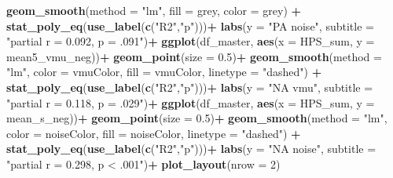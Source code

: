 \documentclass[
]{article}
\newenvironment{Shaded}{\begin{snugshade}}{\end{snugshade}}
\newcommand{\AttributeTok}[1]{\textcolor[rgb]{0.13,0.29,0.53}{#1}}
\newcommand{\DecValTok}[1]{\textcolor[rgb]{0.00,0.00,0.81}{#1}}
\newcommand{\FloatTok}[1]{\textcolor[rgb]{0.00,0.00,0.81}{#1}}
\newcommand{\FunctionTok}[1]{\textcolor[rgb]{0.13,0.29,0.53}{\textbf{#1}}}
\newcommand{\NormalTok}[1]{#1}
\newcommand{\SpecialCharTok}[1]{\textcolor[rgb]{0.81,0.36,0.00}{\textbf{#1}}}
\newcommand{\StringTok}[1]{\textcolor[rgb]{0.31,0.60,0.02}{#1}}
\begin{document}
\begin{Shaded}
\begin{Highlighting}[]
  \FunctionTok{geom\_smooth}\NormalTok{(}\AttributeTok{method =} \StringTok{"lm"}\NormalTok{, }\AttributeTok{fill =} \StringTok{\textquotesingle{}grey\textquotesingle{}}\NormalTok{, }\AttributeTok{color =} \StringTok{\textquotesingle{}grey\textquotesingle{}}\NormalTok{) }\SpecialCharTok{+}
  \FunctionTok{stat\_poly\_eq}\NormalTok{(}\FunctionTok{use\_label}\NormalTok{(}\FunctionTok{c}\NormalTok{(}\StringTok{"R2"}\NormalTok{,}\StringTok{"p"}\NormalTok{)))}\SpecialCharTok{+}
  \FunctionTok{labs}\NormalTok{(}\AttributeTok{y =} \StringTok{"PA noise"}\NormalTok{,}
       \AttributeTok{subtitle =} \StringTok{"partial r = 0.092, p = .091"}\NormalTok{)}\SpecialCharTok{+}
\FunctionTok{ggplot}\NormalTok{(df\_master, }\FunctionTok{aes}\NormalTok{(}\AttributeTok{x =}\NormalTok{ HPS\_sum, }\AttributeTok{y =}\NormalTok{ mean5\_vmu\_neg))}\SpecialCharTok{+}
  \FunctionTok{geom\_point}\NormalTok{(}\AttributeTok{size =} \FloatTok{0.5}\NormalTok{)}\SpecialCharTok{+}
  \FunctionTok{geom\_smooth}\NormalTok{(}\AttributeTok{method =} \StringTok{"lm"}\NormalTok{, }\AttributeTok{color =}\NormalTok{ vmuColor, }\AttributeTok{fill =}\NormalTok{ vmuColor, }\AttributeTok{linetype =} \StringTok{"dashed"}\NormalTok{) }\SpecialCharTok{+}
  \FunctionTok{stat\_poly\_eq}\NormalTok{(}\FunctionTok{use\_label}\NormalTok{(}\FunctionTok{c}\NormalTok{(}\StringTok{"R2"}\NormalTok{,}\StringTok{"p"}\NormalTok{)))}\SpecialCharTok{+}
  \FunctionTok{labs}\NormalTok{(}\AttributeTok{y =} \StringTok{"NA vmu"}\NormalTok{,}
       \AttributeTok{subtitle =} \StringTok{"partial r = 0.118, p = .029"}\NormalTok{)}\SpecialCharTok{+}
\FunctionTok{ggplot}\NormalTok{(df\_master, }\FunctionTok{aes}\NormalTok{(}\AttributeTok{x =}\NormalTok{ HPS\_sum, }\AttributeTok{y =}\NormalTok{ mean\_s\_neg))}\SpecialCharTok{+}
  \FunctionTok{geom\_point}\NormalTok{(}\AttributeTok{size =} \FloatTok{0.5}\NormalTok{)}\SpecialCharTok{+}
  \FunctionTok{geom\_smooth}\NormalTok{(}\AttributeTok{method =} \StringTok{"lm"}\NormalTok{, }\AttributeTok{color =}\NormalTok{ noiseColor, }\AttributeTok{fill =}\NormalTok{ noiseColor, }\AttributeTok{linetype =} \StringTok{"dashed"}\NormalTok{) }\SpecialCharTok{+}
  \FunctionTok{stat\_poly\_eq}\NormalTok{(}\FunctionTok{use\_label}\NormalTok{(}\FunctionTok{c}\NormalTok{(}\StringTok{"R2"}\NormalTok{,}\StringTok{"p"}\NormalTok{)))}\SpecialCharTok{+}
  \FunctionTok{labs}\NormalTok{(}\AttributeTok{y =} \StringTok{"NA noise"}\NormalTok{,}
       \AttributeTok{subtitle =} \StringTok{"partial r = 0.298, p \textless{} .001"}\NormalTok{)}\SpecialCharTok{+}
  \FunctionTok{plot\_layout}\NormalTok{(}\AttributeTok{nrow =} \DecValTok{2}\NormalTok{)}
\end{Highlighting}
\end{Shaded}
\end{document}
